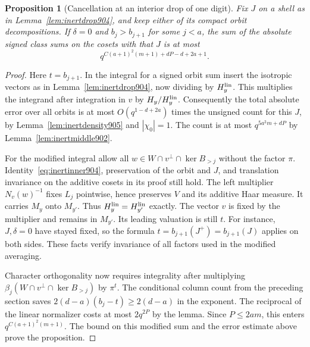 \documentclass[a4paper,11pt]{article}
\newtheorem{proposition}{Proposition}[section]
\theoremstyle{definition}
\theoremstyle{remark}
\numberwithin{equation}{section}
\begin{document}
\begin{proposition}[Cancellation at an interior drop of one digit]
\leavevmode\label{prop:inertonedigit905}
Fix \(J\) on a shell as in Lemma~\ref{lem:inertdrop904}, and
keep either of its compact orbit decompositions. If \(\delta=0\)
and \(b_j>b_{j+1}\) for some \(j<a\), the sum of the absolute
signed class sums on the cosets with that \(J\) is at most
\[
                       q^{C(a+1)^2(m+1)+dP-d+2a+1}.
\]
\end{proposition}
\begin{proof}
Here \(t=b_{j+1}\). In the integral for a signed orbit sum
insert the isotropic vectors as in
Lemma~\ref{lem:inertdrop904}, now dividing by \(H_y^{\rm lin}\).
This multiplies the integrand after integration in \(v\) by
\(H_y/H_y^{\rm lin}\). Consequently the total absolute error
over all orbits is at most \(O(q^{1-d+2a})\) times the unsigned
count for this \(J\), by Lemma~\ref{lem:inertdensity905} and
\(|\chi_0|=1\). The count is at most
\(q^{5a^2m+dP}\) by Lemma~\ref{lem:inertmiddle902}.

For the modified integral allow all
\(w\in W\cap v^\perp\cap\ker B_{>j}\) without the factor
\(\pi\). Identity~\eqref{eq:inertinner904}, preservation of
the orbit and \(J\), and translation invariance on the additive
cosets in its proof still hold. The left multiplier \(N_v(w)^{-1}\)
fixes \(L_j\) pointwise, hence preserves \(V\) and its additive
Haar measure. It carries \(M_y\) onto \(M_{y'}\). Thus
\(H_y^{\rm lin}=H_{y'}^{\rm lin}\) exactly.
The vector \(v\) is fixed by the multiplier and remains in
\(M_{y'}\). Its leading valuation is still \(t\). For instance,
\(J,\delta=0\) have stayed fixed, so the formula
\(t=b_{j+1}(J^+)=b_{j+1}(J)\) applies on both sides.
These facts verify invariance of all factors used in the
modified averaging.

Character orthogonality now requires integrality after multiplying
\(\beta_j(W\cap v^\perp\cap\ker B_{>j})\) by \(\pi^t\).
The conditional column count from the preceding section saves
\(2(d-a)(b_j-t)\ge2(d-a)\) in the exponent.
The reciprocal of the linear normalizer costs at most
\(2q^{2P}\) by the lemma. Since \(P\le2am\), this enters
\(q^{C(a+1)^2(m+1)}\). The bound on this modified sum and
the error estimate above prove the proposition.
\end{proof}
\end{document}
